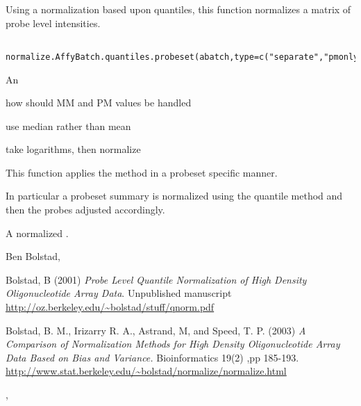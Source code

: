 \begin{Description}\relax
Using a normalization based upon quantiles, this function
normalizes a matrix of probe level intensities.
\end{Description}
\begin{Usage}
\begin{verbatim}
  normalize.AffyBatch.quantiles.probeset(abatch,type=c("separate","pmonly","mmonly","together"),use.median=FALSE,use.log=TRUE)
\end{verbatim}
\end{Usage}
\begin{Arguments}
\begin{ldescription}
\item[\code{abatch}] An 
\item[\code{type}] how should MM and PM values be handled
\item[\code{use.median}] use median rather than mean
\item[\code{use.log}] take logarithms, then normalize
\end{ldescription}
\end{Arguments}
\begin{Details}\relax
This function applies the  method in a probeset specific manner.

In particular a probeset summary is normalized using the quantile
method and then the probes adjusted accordingly.
\end{Details}
\begin{Value}
A normalized .
\end{Value}
\begin{Author}\relax
Ben Bolstad, 
\end{Author}
\begin{References}\relax
Bolstad, B (2001) \emph{Probe Level Quantile Normalization of High Density
Oligonucleotide Array Data}. Unpublished manuscript
\url{http://oz.berkeley.edu/~bolstad/stuff/qnorm.pdf}

Bolstad, B. M., Irizarry R. A., Astrand, M, and Speed, T. P. (2003)
\emph{A Comparison of Normalization Methods for High Density
Oligonucleotide Array Data Based on Bias and Variance.}
Bioinformatics 19(2) ,pp 185-193. \url{http://www.stat.berkeley.edu/~bolstad/normalize/normalize.html}
\end{References}
\begin{SeeAlso}\relax
{}, 
\end{SeeAlso}

